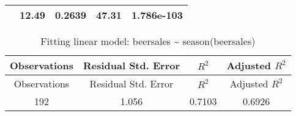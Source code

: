 \documentclass[]{book}
\theoremstyle{definition}
\theoremstyle{definition}
\theoremstyle{remark}
\begin{document}
\begin{longtable}[c]{@{}ccccc@{}}
\begin{minipage}[t]{0.37\columnwidth}
\strut\end{minipage} &
\begin{minipage}[t]{0.12\columnwidth}\centering\strut
12.49
\strut\end{minipage} &
\begin{minipage}[t]{0.14\columnwidth}\centering\strut
0.2639
\strut\end{minipage} &
\begin{minipage}[t]{0.11\columnwidth}\centering\strut
47.31
\strut\end{minipage} &
\begin{minipage}[t]{0.11\columnwidth}\centering\strut
1.786e-103
\strut\end{minipage}\tabularnewline
\bottomrule
\end{longtable}

\begin{longtable}[c]{@{}cccc@{}}
\caption{Fitting linear model: beersales \textasciitilde{}
season(beersales)}\tabularnewline
\toprule
\begin{minipage}[b]{0.18\columnwidth}\centering\strut
Observations
\strut\end{minipage} &
\begin{minipage}[b]{0.27\columnwidth}\centering\strut
Residual Std. Error
\strut\end{minipage} &
\begin{minipage}[b]{0.10\columnwidth}\centering\strut
\(R^2\)
\strut\end{minipage} &
\begin{minipage}[b]{0.20\columnwidth}\centering\strut
Adjusted \(R^2\)
\strut\end{minipage}\tabularnewline
\midrule
\endfirsthead
\toprule
\begin{minipage}[b]{0.18\columnwidth}\centering\strut
Observations
\strut\end{minipage} &
\begin{minipage}[b]{0.27\columnwidth}\centering\strut
Residual Std. Error
\strut\end{minipage} &
\begin{minipage}[b]{0.10\columnwidth}\centering\strut
\(R^2\)
\strut\end{minipage} &
\begin{minipage}[b]{0.20\columnwidth}\centering\strut
Adjusted \(R^2\)
\strut\end{minipage}\tabularnewline
\midrule
\endhead
\begin{minipage}[t]{0.18\columnwidth}\centering\strut
192
\strut\end{minipage} &
\begin{minipage}[t]{0.27\columnwidth}\centering\strut
1.056
\strut\end{minipage} &
\begin{minipage}[t]{0.10\columnwidth}\centering\strut
0.7103
\strut\end{minipage} &
\begin{minipage}[t]{0.20\columnwidth}\centering\strut
0.6926
\strut\end{minipage}\tabularnewline
\bottomrule
\end{longtable}
\end{document}
